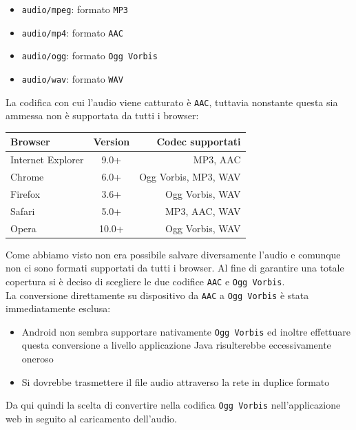 \begin{itemize}
	\item \texttt{audio/mpeg}: formato \texttt{MP3}
	\item \texttt{audio/mp4}: formato \texttt{AAC}
	\item \texttt{audio/ogg}: formato \texttt{Ogg Vorbis}
	\item \texttt{audio/wav}: formato \texttt{WAV}
\end{itemize}

La codifica con cui l'audio viene catturato è \texttt{AAC}, tuttavia nonstante questa sia ammessa non è supportata da tutti i browser:

\begin{center}
\begin{tabular}{ l c r }
\textbf{Browser} & \textbf{Version} & \textbf{Codec supportati} \\
\toprule
Internet Explorer &	9.0+ & MP3, AAC \\
\midrule
Chrome & 6.0+ & Ogg Vorbis, MP3, WAV \\
\midrule
Firefox & 3.6+ & Ogg Vorbis, WAV \\
\midrule
Safari & 5.0+ & MP3, AAC, WAV \\
\midrule
Opera & 10.0+ & Ogg Vorbis, WAV \\
\bottomrule
\end{tabular}
\end{center}

Come abbiamo visto non era possibile salvare diversamente l'audio e comunque non ci sono formati supportati da tutti i browser. Al fine di garantire una totale copertura si è deciso di scegliere le due codifice \texttt{AAC} e \texttt{Ogg Vorbis}.\\

La conversione direttamente su dispositivo da \texttt{AAC} a \texttt{Ogg Vorbis} è stata immediatamente esclusa:
\begin{itemize}
	\item Android non sembra supportare nativamente \texttt{Ogg Vorbis} ed inoltre effettuare questa conversione a livello applicazione Java risulterebbe eccessivamente oneroso
	\item Si dovrebbe trasmettere il file audio attraverso la rete in duplice formato
\end{itemize}
Da qui quindi la scelta di convertire nella codifica \texttt{Ogg Vorbis} nell'applicazione web in seguito al caricamento dell'audio.\\

